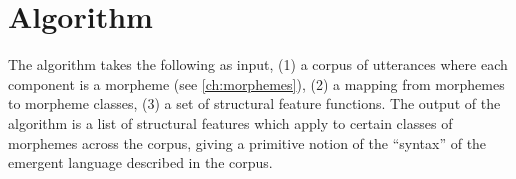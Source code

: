 
 

\section{Algorithm}

The algorithm takes the following as input,
  (1) a corpus of utterances where each component is a morpheme (see \cref{ch:morphemes}),
  (2) a mapping from morphemes to morpheme classes,
  (3) a set of structural feature functions.
The output of the algorithm is a list of structural features which apply to certain classes of morphemes across the corpus, giving a primitive notion of the ``syntax'' of the emergent language described in the corpus.


